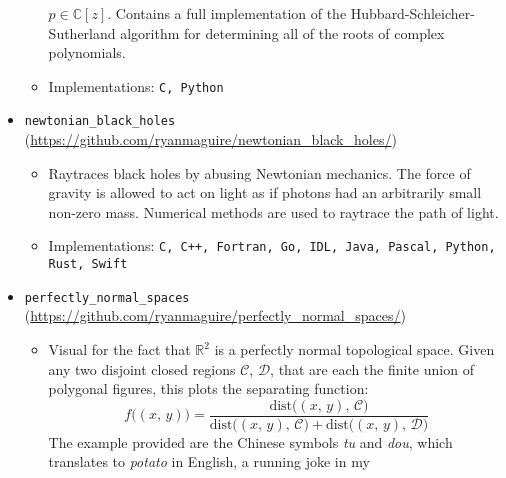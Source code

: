 \documentclass[a4paper,sans]{moderncv}
\begin{document}
\begin{itemize}
\begin{itemize}
                        $p\in\mathbb{C}[z]$. Contains a full implementation of
                        the Hubbard-Schleicher-Sutherland algorithm for
                        determining all of the roots of complex polynomials.
                    \item
                        Implementations: \texttt{C, Python}
                \end{itemize}
            \item
                \texttt{newtonian\_black\_holes} (\url{https://github.com/ryanmaguire/newtonian_black_holes/})
                \begin{itemize}
                    \item
                        Raytraces black holes by abusing Newtonian mechanics.
                        The force of gravity is allowed to act on light as if
                        photons had an arbitrarily small non-zero mass.
                        Numerical methods are used to raytrace the path of
                        light.
                    \item
                        Implementations:
                        \texttt{C, C++, Fortran, Go, IDL, Java, Pascal, Python, Rust, Swift}
                \end{itemize}
            \item
                \texttt{perfectly\_normal\_spaces} (\url{https://github.com/ryanmaguire/perfectly_normal_spaces/})
                \begin{itemize}
                    \item
                        Visual for the fact that $\mathbb{R}^{2}$ is a perfectly
                        normal topological space. Given any two disjoint closed
                        regions $\mathcal{C}$, $\mathcal{D}$, that are each the
                        finite union of polygonal figures, this plots the
                        separating function:
                        \begin{equation}
                            f\big((x,\,y)\big)
                            =\frac{\textrm{dist}\big((x,\,y),\,\mathcal{C}\big)}
                            {\textrm{dist}\big((x,\,y),\,\mathcal{C}\big)+
                             \textrm{dist}\big((x,\,y),\,\mathcal{D}\big)}
                        \end{equation}
                        The example provided are the Chinese symbols
                        \textit{tu} and \textit{dou}, which translates to
                        \textit{potato} in English, a running joke in my

\end{itemize}
\end{itemize}
\end{document}
